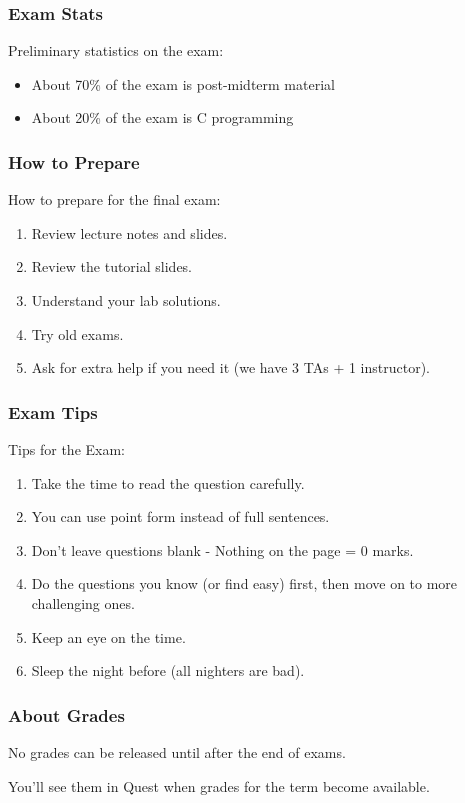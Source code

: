\begin{frame}
\frametitle{Exam Stats}

Preliminary statistics on the exam:

\begin{itemize}
	\item About 70\% of the exam is post-midterm material
	\item About 20\% of the exam is C programming
\end{itemize}

\end{frame}

\begin{frame}
\frametitle{How to Prepare}

How to prepare for the final exam:

\begin{enumerate}
	\item Review lecture notes and slides.
	\item Review the tutorial slides.
	\item Understand your lab solutions.
	\item Try old exams.
	\item Ask for extra help if you need it (we have 3 TAs + 1 instructor).
\end{enumerate}

\end{frame}

\begin{frame}
\frametitle{Exam Tips}

Tips for the Exam:

\begin{enumerate}
	\item Take the time to read the question carefully.
	\item You can use point form instead of full sentences.
	\item Don't leave questions blank - Nothing on the page = 0 marks.
	\item Do the questions you know (or find easy) first, then move on to more challenging ones.
	\item Keep an eye on the time.
	\item Sleep the night before (all nighters are bad).
	
\end{enumerate}

\end{frame}

\begin{frame}
\frametitle{About Grades}

No grades can be released until after the end of exams.

You'll see them in Quest when grades for the term become available.


\end{frame}




